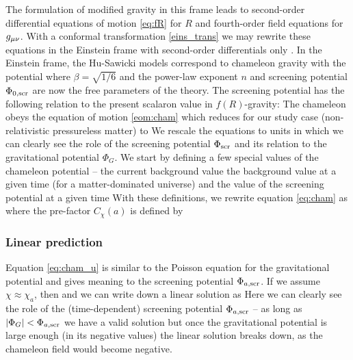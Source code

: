 The formulation of modified gravity in this frame leads to second-order differential equations of motion \eqref{eq:fR} for $R$ and fourth-order field equations for $g_{\mu\nu}$. With a conformal transformation \eqref{eins_trans} we may rewrite these equations in the Einstein frame with second-order differentials only \parencite[see, e.g.,][]{CHIBA20031}. In the Einstein frame, the Hu-Sawicki models correspond to chameleon gravity with the potential
where $\beta=\sqrt{1/6}$ and the power-law exponent $n$ and screening potential $\Phi_{0,\text{\scriptsize scr}}$ are now the free parameters of the theory. The screening potential has the following relation to the present scalaron value in $f(R)$-gravity:
The chameleon obeys the equation of motion \eqref{eom:cham} which reduces for our study case (non-relativistic pressureless matter) to
We rescale the equations to units in which we can clearly see the role of the screening potential $\Phi_{\text{\scriptsize scr}}$ and its relation to the gravitational potential $\Phi_G$. We start by defining a few special values of the chameleon potential -- the current background value
the background value at a given time (for a matter-dominated universe)
and the value of the screening potential at a given time
With these definitions, we rewrite equation \eqref{eq:cham} as
where the pre-factor $C_\chi(a)$ is defined by
\subsubsection{Linear prediction}
Equation \eqref{eq:cham_u} is similar to the Poisson equation for the gravitational potential and gives meaning to the screening potential $\Phi_{a,\text{\scriptsize scr}}$. If we assume $\chi\approx\chi_a$, then
and we can write down a linear solution as
Here we can clearly see the role of the (time-dependent) screening potential $\Phi_{a,\text{\scriptsize scr}}$ -- as long as $|\Phi_G| < \Phi_{a,\text{\scriptsize scr}}$ we have a valid solution but once the gravitational potential is large enough (in its negative values) the linear solution breaks down, as the chameleon field would become negative.

